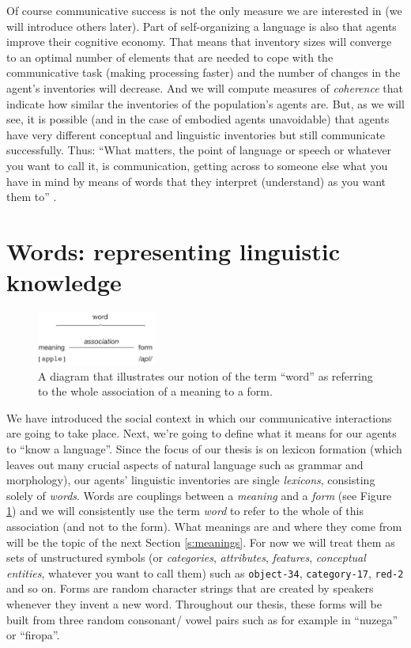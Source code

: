 Of course communicative success is not the only measure we are
interested in (we will introduce others later). Part of
self-organizing a language is also that agents improve their cognitive
economy. That means that inventory sizes will converge to an optimal
number of elements that are needed to cope with the communicative task
(making processing faster) and the number of changes in the agent's
inventories will decrease. And we will compute measures of
\emph{coherence} that indicate how similar the inventories of the
population's agents are. But, as we will see, it is possible (and in
the case of embodied agents unavoidable) that agents have very
different conceptual and linguistic inventories but still communicate
successfully. Thus: ``What matters, the point of language or speech or
whatever you want to call it, is communication, getting across to
someone else what you have in mind by means of words that they
interpret (understand) as you want them to''
\citep[p. 120]{davidson05truth}.



\section{Words: representing linguistic knowledge}
\label{s:representing-linguistic-knowlede}

\begin{figure}
  \parbox{0.6\textwidth}{\centerline{\includegraphics[width=0.35\textwidth]{figures/saussurean-sign}}}
  \caption{A diagram that illustrates our notion of the term ``word''
    as referring to the whole association of a meaning to a form.}
  \label{f:saussurean-sign}
\end{figure}

We have introduced the social context in which our communicative
interactions are going to take place. Next, we're going to define what
it means for our agents to ``know a language''. Since the focus of our
thesis is on lexicon formation (which leaves out many crucial aspects
of natural language such as grammar and morphology), our agents'
linguistic inventories are single \emph{lexicons}, consisting solely
of \emph{words}. Words are couplings between a \emph{meaning} and a
\emph{form} (see Figure \ref{f:saussurean-sign}) and we will
consistently use the term \emph{word} to refer to the whole of this
association (and not to the form). What meanings are and where they
come from will be the topic of the next Section \ref{s:meanings}. For
now we will treat them as sets of unstructured symbols (or
\emph{categories}, \emph{attributes}, \emph{features},
\emph{conceptual entities}, whatever you want to call them) such as
{\tt object-34}, {\tt category-17}, {\tt red-2} and so on. Forms are
random character strings that are created by speakers whenever they
invent a new word. Throughout our thesis, these forms will be built
from three random consonant/ vowel pairs such as for example in
``nuzega'' or ``firopa''.


